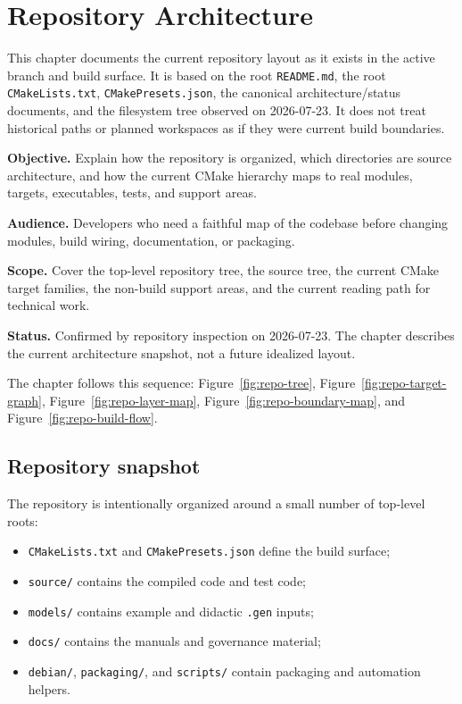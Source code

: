 \chapter{Repository Architecture}
\label{chap:repository-architecture}

This chapter documents the current repository layout as it exists in the active
branch and build surface. It is based on the root \texttt{README.md}, the root
\texttt{CMakeLists.txt}, \texttt{CMakePresets.json}, the canonical
architecture/status documents, and the filesystem tree observed on
2026-07-23. It does not treat historical paths or planned workspaces as if they
were current build boundaries.

\noindent\textbf{Objective.} Explain how the repository is organized, which
directories are source architecture, and how the current CMake hierarchy maps to
real modules, targets, executables, tests, and support areas.

\noindent\textbf{Audience.} Developers who need a faithful map of the codebase
before changing modules, build wiring, documentation, or packaging.

\noindent\textbf{Scope.} Cover the top-level repository tree, the source tree,
the current CMake target families, the non-build support areas, and the current
reading path for technical work.

\noindent\textbf{Status.} Confirmed by repository inspection on 2026-07-23.
The chapter describes the current architecture snapshot, not a future idealized
layout.

The chapter follows this sequence:
Figure~\ref{fig:repo-tree},
Figure~\ref{fig:repo-target-graph},
Figure~\ref{fig:repo-layer-map},
Figure~\ref{fig:repo-boundary-map}, and
Figure~\ref{fig:repo-build-flow}.

\section{Repository snapshot}
\label{sec:repo-snapshot}

The repository is intentionally organized around a small number of top-level
roots:
\begin{itemize}
\item \texttt{CMakeLists.txt} and \texttt{CMakePresets.json} define the build
surface;
\item \texttt{source/} contains the compiled code and test code;
\item \texttt{models/} contains example and didactic \texttt{.gen} inputs;
\item \texttt{docs/} contains the manuals and governance material;
\item \texttt{debian/}, \texttt{packaging/}, and \texttt{scripts/} contain
packaging and automation helpers.
\end{itemize}

